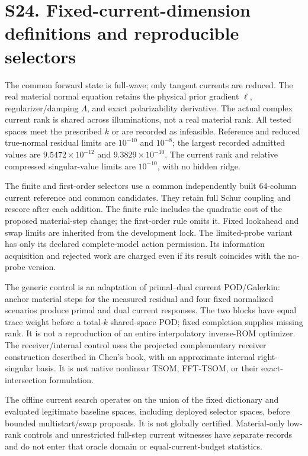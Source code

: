 \clearpage
\section*{S24. Fixed-current-dimension definitions and reproducible selectors}
The common forward state is full-wave; only tangent currents are reduced. The real material normal equation retains the physical prior gradient $\ell$, regularizer/damping $\Lambda$, and exact polarizability derivative. The actual complex current rank is shared across illuminations, not a real material rank. All tested spaces meet the prescribed $k$ or are recorded as infeasible. Reference and reduced true-normal residual limits are $10^{-10}$ and $10^{-8}$; the largest recorded admitted values are $9.5472\times10^{-12}$ and $9.3829\times10^{-10}$. The current rank and relative compressed singular-value limits are $10^{-10}$, with no hidden ridge.

The finite and first-order selectors use a common independently built 64-column current reference and common candidates. They retain full Schur coupling and rescore after each addition. The finite rule includes the quadratic cost of the proposed material-step change; the first-order rule omits it. Fixed lookahead and swap limits are inherited from the development lock. The limited-probe variant has only its declared complete-model action permission. Its information acquisition and rejected work are charged even if its result coincides with the no-probe version.

The generic control is an adaptation of primal--dual current POD/Galerkin: anchor material steps for the measured residual and four fixed normalized scenarios produce primal and dual current responses. The two blocks have equal trace weight before a total-$k$ shared-space POD; fixed completion supplies missing rank. It is not a reproduction of an entire interpolatory inverse-ROM optimizer. The receiver/internal control uses the projected complementary receiver construction described in Chen's book, with an approximate internal right-singular basis. It is not native nonlinear TSOM, FFT-TSOM, or their exact-intersection formulation.

The offline current search operates on the union of the fixed dictionary and evaluated legitimate baseline spaces, including deployed selector spaces, before bounded multistart/swap proposals. It is not globally certified. Material-only low-rank controls and unrestricted full-step current witnesses have separate records and do not enter that oracle domain or equal-current-budget statistics.

